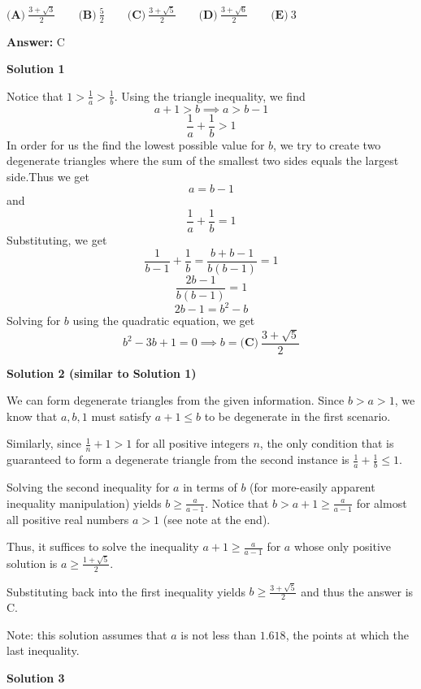 \begin{enumerate}
 $\textbf{(A)}\ \frac{3+\sqrt{3}}{2}\qquad\textbf{(B)}\ \frac{5}{2}\qquad\textbf{(C)}\ \frac{3+\sqrt{5}}{2}\qquad\textbf{(D)}\ \frac{3+\sqrt{6}}{2}\qquad\textbf{(E)}\ 3$

 \textbf{Answer: }C



\textbf{Solution 1}

Notice that $1>\frac{1}{a}>\frac{1}{b}$.  Using the triangle inequality, we find 
 \[a+1 > b \implies a>b-1\]
 \[\frac{1}{a}+\frac{1}{b} > 1\]In order for us the find the lowest possible value for $b$, we try to create two degenerate triangles where the sum of the smallest two sides equals the largest side.Thus we get 
 \[a=b-1\] and 
 \[\frac{1}{a} + \frac{1}{b}=1\]Substituting, we get
 \[\frac{1}{b-1}+\frac{1}{b}=\frac{b+b-1}{b(b-1)}=1\]
 \[\frac{2b-1}{b(b-1)} = 1\]
 \[2b-1=b^2-b\]Solving for $b$ using the quadratic equation, we get
 \[b^2-3b+1=0 \implies b = \boxed{\textbf{(C)} \ \frac{3+\sqrt{5}}{2}}\]




\textbf{Solution 2 (similar to Solution 1)}

We can form degenerate triangles from the given information. Since $b>a>1$, we know that $a,b,1$ must satisfy $a + 1 \le b$ to be degenerate in the first scenario. 

 
Similarly, since $\frac{1}{n} + 1 > 1$ for all positive integers $n$, the only condition that is guaranteed to form a degenerate triangle from the second instance is $\frac{1}{a} + \frac{1}{b} \le 1$.

 
Solving the second inequality for $a$ in terms of $b$ (for more-easily apparent inequality manipulation) yields $b\ge \frac{a}{a-1}$. Notice that $b> a+1 \ge \frac{a}{a-1}$ for almost all positive real numbers $a>1$ (see note at the end). 

 
Thus, it suffices to solve the inequality $a+1 \ge \frac{a}{a-1}$ for $a$ whose only positive solution is $a \ge \frac{1 + \sqrt{5}}{2}$. 

 
Substituting back into the first inequality yields $\boxed{b \ge \frac{3 + \sqrt{5}}{2}}$ and thus the answer is $\text{C}$.

 


 Note: this solution assumes that $a$ is not less than $1.618$, the points at which the last inequality. 

 


 



\textbf{Solution 3}


\end{enumerate}
